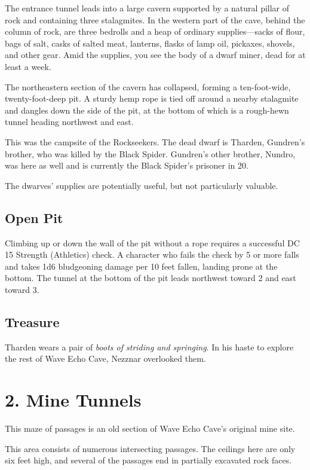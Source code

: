 \documentclass[10pt,a4paper,twoside,bg=print,twocolumn,openany,nodeprecatedcode]{dndbook}
\begin{document}
\begin{DndReadAloud}{}
The entrance tunnel leads into a large cavern supported by a natural pillar of rock and containing three stalagmites. In the western part of the cave, behind the column of rock, are three bedrolls and a heap of ordinary supplies—sacks of flour, bags of salt, casks of salted meat, lanterns, flasks of lamp oil, pickaxes, shovels, and other gear. Amid the supplies, you see the body of a dwarf miner, dead for at least a week.

The northeastern section of the cavern has collapsed, forming a ten-foot-wide, twenty-foot-deep pit. A sturdy hemp rope is tied off around a nearby stalagmite and dangles down the side of the pit, at the bottom of which is a rough-hewn tunnel heading northwest and east.

\end{DndReadAloud}

This was the campsite of the Rockseekers. The dead dwarf is Tharden, Gundren's brother, who was killed by the Black Spider. Gundren's other brother, Nundro, was here as well and is currently the Black Spider's prisoner in 20.

The dwarves' supplies are potentially useful, but not particularly valuable.

\subsection{Open Pit}
Climbing up or down the wall of the pit without a rope requires a successful DC 15 Strength (Athletics) check. A character who fails the check by 5 or more falls and takes 1d6 bludgeoning damage per 10 feet fallen, landing prone at the bottom. The tunnel at the bottom of the pit leads northwest toward 2 and east toward 3.

\subsection{Treasure}
Tharden wears a pair of \textit{boots of striding and springing}. In his haste to explore the rest of Wave Echo Cave, Nezznar overlooked them.

\section{2. Mine Tunnels}
This maze of passages is an old section of Wave Echo Cave's original mine site.

\begin{DndReadAloud}{}
This area consists of numerous intersecting passages. The ceilings here are only six feet high, and several of the passages end in partially excavated rock faces.

\end{DndReadAloud}
\end{document}
